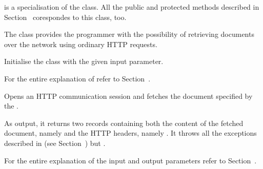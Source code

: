 \documentclass{ozdoc}
\begin{document}
 is a specialisation of the  class. All the public and protected methods described in Section~ corespondes to this class, too.

The  class provides the programmer with the possibility of retrieving documents over the network using ordinary  HTTP requests. \mozartEMPTY
 \mozartEMPTY
\begin{mozartDESCRIPTION}
\mozartENTRYHASCODE
\begin{mozartSYNOPSIS}
\begin{mozartCODEDISPLAY}\mozartFACETEXT{)}\end{mozartCODEDISPLAY}
\end{mozartSYNOPSIS}
\mozartITEM Initialise the class with the given  input parameter.

  \mozartEMPTY
For the entire explanation of  refer to Section~. \mozartEMPTY
{}\mozartENTRYHASCODE
\begin{mozartSYNOPSIS}
\begin{mozartCODEDISPLAY}\mozartFACETEXT{\mozartSPACE{}}\mozartFACETEXT{\mozartSPACE{}}\mozartFACETEXT{)}\end{mozartCODEDISPLAY}
\end{mozartSYNOPSIS}
\mozartITEM Opens an HTTP communication session and fetches the document specified by the .

As output, it returns two records containing both the content of the fetched document, namely  and the HTTP headers, namely . It throws all the exceptions described in (see Section~) but .  

For the entire explanation of the input and output parameters refer to Section~. \mozartEMPTY
\end{mozartDESCRIPTION}
\end{document}
